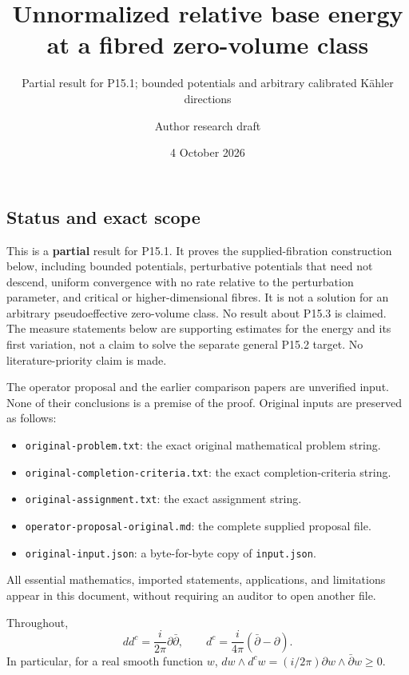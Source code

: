 \documentclass[
  11pt,
]{article}
\title{Unnormalized relative base energy at a fibred zero-volume class}
\subtitle{Partial result for P15.1; bounded potentials and arbitrary
calibrated Kähler directions}
\author{Author research draft}
\date{4 October 2026}
\providecommand{\tightlist}{%
  \setlength{\itemsep}{0pt}\setlength{\parskip}{0pt}}
\begin{document}
\maketitle

\subsection{Status and exact scope}\label{status-and-exact-scope}

This is a \textbf{partial} result for P15.1. It proves the
supplied-fibration construction below, including bounded potentials,
perturbative potentials that need not descend, uniform convergence with
no rate relative to the perturbation parameter, and critical or
higher-dimensional fibres. It is not a solution for an arbitrary
pseudoeffective zero-volume class. No result about P15.3 is claimed. The
measure statements below are supporting estimates for the energy and its
first variation, not a claim to solve the separate general P15.2 target.
No literature-priority claim is made.

The operator proposal and the earlier comparison papers are unverified
input. None of their conclusions is a premise of the proof. Original
inputs are preserved as follows:

\begin{itemize}
\tightlist
\item
  \texttt{original-problem.txt}: the exact original mathematical problem
  string.
\item
  \texttt{original-completion-criteria.txt}: the exact
  completion-criteria string.
\item
  \texttt{original-assignment.txt}: the exact assignment string.
\item
  \texttt{operator-proposal-original.md}: the complete supplied proposal
  file.
\item
  \texttt{original-input.json}: a byte-for-byte copy of
  \texttt{input.json}.
\end{itemize}

All essential mathematics, imported statements, applications, and
limitations appear in this document, without requiring an auditor to
open another file.

Throughout, \[dd^c=\frac{i}{2\pi}\partial\bar\partial,
\qquad d^c=\frac{i}{4\pi}(\bar\partial-\partial).\] In particular, for a
real smooth function \(w\),
\(dw\wedge d^cw=(i/2\pi)\partial w\wedge\bar\partial w\geq0\).
\end{document}
